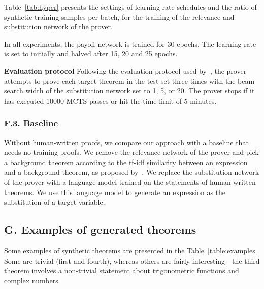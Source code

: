 \documentclass{article}
\begin{document}
Table~\ref{tab:hyper} presents the settings of learning rate schedules 
and
the ratio of synthetic training samples per batch, 
for the training of the relevance and substitution network
of the prover.

In all experiments, the payoff network is trained for 30 epochs. 
The learning rate is set to  initially and halved
after 15, 20 and 25 epochs.

\noindent\textbf{Evaluation protocol}
Following the evaluation protocol used by~\citet{whalen2016holophrasm},
the prover attempts to prove each target theorem in the test set
three times with the beam search width of the substitution network set to 1, 5, or 20.
The prover stops if it has executed 10000 MCTS passes
or hit the time limit of 5 minutes.

\subsubsection*{F.3. Baseline}

Without human-written proofs,
we compare our approach with a baseline that needs no training proofs.
We remove the relevance network of the prover 
and pick a background theorem according to 
the tf-idf similarity between an expression and a background theorem, as proposed by~\citet{bansal2019learning}.
We replace the substitution network of the prover 
with a language model trained on the statements of human-written theorems.
We use this language model to generate an expression as the substitution of a target variable.

\subsection*{G. Examples of generated theorems}
Some examples of synthetic theorems are presented in the Table~\ref{table:examples}. Some are trivial (first and fourth), whereas others are fairly interesting---the third theorem involves a non-trivial statement about trigonometric functions and complex numbers. 
\end{document}
